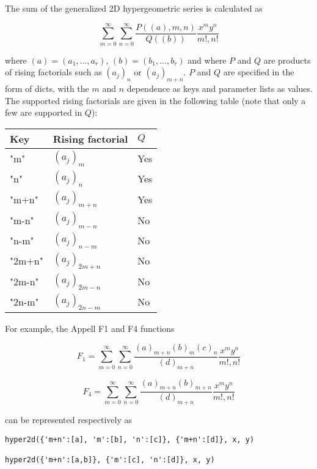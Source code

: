 \vpara
The sum of the generalized 2D hypergeometric series is calculated as

\begin{equation}
\sum_{m=0}^{\infty} \sum_{n=0}^{\infty} \frac{P((a),m,n)}{Q((b))} \frac{x^my^n}{m!,n!}
\end{equation}

where $(a)=(a_1,\ldots,a_r)$, $(b)=(b_1,\ldots,b_r)$ and where $P$ and $Q$ are products of rising factorials such as $(a_j)_n$ or $(a_j)_{m+n}$. $P$ and $Q$ are specified in the form of dicts, with the $m$ and $n$ dependence as keys and parameter lists as values. The supported rising factorials are given in the following table (note that only a few are supported in $Q$):



\begin{table}[ht]
	\centering
	\begin{tabular}{|l|l|l|}
		\hline
		Key & Rising factorial & $Q$\\
		\hline
		"m" & $(a_j)_m$ &  Yes \\
		"n" & $(a_j)_n$ &  Yes \\
		"m+n" & $(a_j)_{m+n}$ &  Yes \\				
		"m-n" & $(a_j)_{m-n}$ &  No \\
		"n-m" & $(a_j)_{n-m}$ &  No \\
		"2m+n" & $(a_j)_{2m+n}$ &  No \\				
		"2m-n" & $(a_j)_{2m-n}$ &  No \\
		"2n-m" & $(a_j)_{2n-m}$ &  No \\
		\hline
	\end{tabular}
\end{table}

For example, the Appell F1 and F4 functions

\begin{equation}
F_1 = \sum_{m=0}^{\infty} \sum_{n=0}^{\infty} \frac{(a)_{m+n}(b)_m (c)_n}{(d)_{m+n}} \frac{x^my^n}{m!,n!}
\end{equation}

\begin{equation}
F_4 = \sum_{m=0}^{\infty} \sum_{n=0}^{\infty} \frac{(a)_{m+n}(b)_{m+n} }{(d)_{m+n}} \frac{x^my^n}{m!,n!}
\end{equation}


can be represented respectively as


\begin{lstlisting}
hyper2d({'m+n':[a], 'm':[b], 'n':[c]}, {'m+n':[d]}, x, y)

hyper2d({'m+n':[a,b]}, {'m':[c], 'n':[d]}, x, y)
\end{lstlisting}



